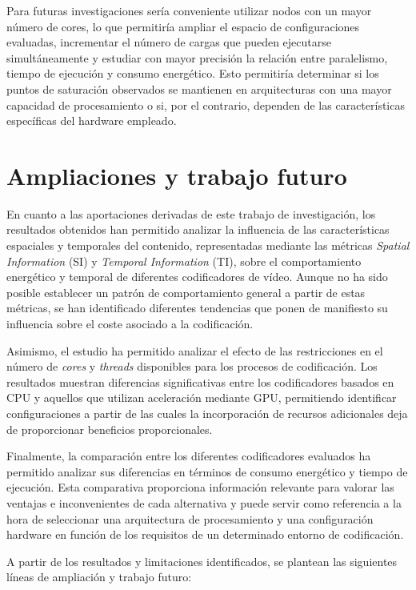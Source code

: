 Para futuras investigaciones sería conveniente utilizar nodos con un mayor número de cores, lo que permitiría ampliar el espacio de configuraciones evaluadas, incrementar el número de cargas que pueden ejecutarse simultáneamente y estudiar con mayor precisión la relación entre paralelismo, tiempo de ejecución y consumo energético. Esto permitiría determinar si los puntos de saturación observados se mantienen en arquitecturas con una mayor capacidad de procesamiento o si, por el contrario, dependen de las características específicas del hardware empleado.

\section{Ampliaciones y trabajo futuro}

En cuanto a las aportaciones derivadas de este trabajo de investigación, los resultados obtenidos han permitido analizar la influencia de las características espaciales y temporales del contenido, representadas mediante las métricas \textit{Spatial Information} (SI) y \textit{Temporal Information} (TI), sobre el comportamiento energético y temporal de diferentes codificadores de vídeo. Aunque no ha sido posible establecer un patrón de comportamiento general a partir de estas métricas, se han identificado diferentes tendencias que ponen de manifiesto su influencia sobre el coste asociado a la codificación.

Asimismo, el estudio ha permitido analizar el efecto de las restricciones en el número de \textit{cores} y \textit{threads} disponibles para los procesos de codificación. Los resultados muestran diferencias significativas entre los codificadores basados en CPU y aquellos que utilizan aceleración mediante GPU, permitiendo identificar configuraciones a partir de las cuales la incorporación de recursos adicionales deja de proporcionar beneficios proporcionales.

Finalmente, la comparación entre los diferentes codificadores evaluados ha permitido analizar sus diferencias en términos de consumo energético y tiempo de ejecución. Esta comparativa proporciona información relevante para valorar las ventajas e inconvenientes de cada alternativa y puede servir como referencia a la hora de seleccionar una arquitectura de procesamiento y una configuración hardware en función de los requisitos de un determinado entorno de codificación.

A partir de los resultados y limitaciones identificados, se plantean las siguientes líneas de ampliación y trabajo futuro:

